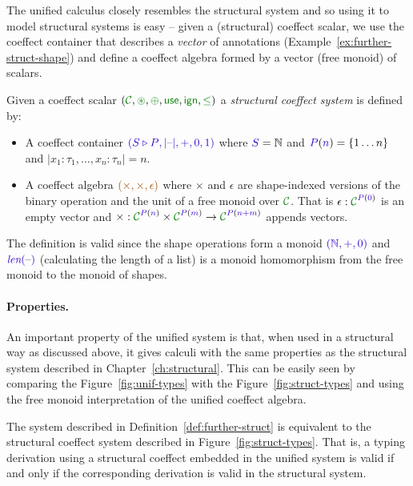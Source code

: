 The unified calculus closely resembles the structural system and so using it to model structural
systems is easy -- given a (structural) coeffect scalar, we use the coeffect container that describes
a \emph{vector} of annotations (Example~\ref{ex:further-struct-shape}) and define a coeffect
algebra formed by a vector (free monoid) of scalars.

\begin{definition}
\label{def:further-struct}
Given a coeffect scalar $(\C, \cseq, \cpar, \cunit, \czero, \cleq)$ a \emph{structural coeffect system}
is defined by:

\begin{itemize}
\item A coeffect container $\sclrd{(\SHP, {|}\textnormal{--}{|}, +, 0, 1)}$ where $\SH=\mathbb{N}$ and
  $\SP(\sclrd{n})=\{ 1 \ldots n \}$ and  ${|}x_1\!:\!\tau_1,\ldots,x_n\!:\!\tau_n{|}=n$.

\item A coeffect algebra $\aclrd{(\times, \times, \epsilon)}$ where $\times$ and $\epsilon$ are
  shape-indexed versions of the binary operation and the unit of a free monoid over $\C$.
  That is $\epsilon : \C^{\SP(\sclrd{0})}$ is an empty vector and
  $\times : \C^{\SP(\sclrd{n})} \times \C^{\SP(\sclrd{m})} \rightarrow \C^{\SP(\sclrd{n + m})}$
  appends vectors.
\end{itemize}
\end{definition}

\noindent
The definition is valid since the shape operations form a monoid
$\sclrd{(\mathbb{N}, +, 0)}$ and $\slen{\textnormal{--}}$ (calculating the length of
a list) is a monoid homomorphism from the free monoid to the monoid of
shapes.

\paragraph{Properties.}
An important property of the unified system is that, when used in a structural way as discussed
above, it gives calculi with the same properties as the structural system described in
Chapter~\ref{ch:structural}. This can be easily seen by comparing the Figure~\ref{fig:unif-types}
with the Figure~\ref{fig:struct-types} and using the free monoid interpretation of the unified
coeffect algebra.

\begin{remark}
The system described in Definition~\ref{def:further-struct} is equivalent to the structural coeffect
system described in Figure~\ref{fig:struct-types}. That is, a typing derivation using a structural
coeffect embedded in the unified system is valid if and only if the corresponding derivation is
valid in the structural system.
\end{remark}

